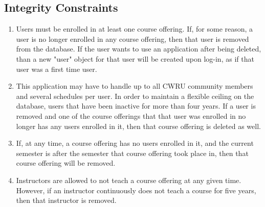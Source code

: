 \documentclass[pdftex,12pt,letter]{article}
\begin{document}
\subsection*{Integrity Constraints}
\begin{enumerate}
\item Users must be enrolled in at least one course offering. If, for some reason, a user is no longer enrolled in any course offering, then that user is removed from the database. If the user wants to use an application after being deleted, than a new "user" object for that user will be created upon log-in, as if that user was a first time user.
\item This application may have to handle up to all CWRU community members and several schedules per user. In order to maintain a flexible ceiling on the database, users that have been inactive for more than four years. If a user is removed and one of the course offerings that that user was enrolled in no longer has any users enrolled in it, then that course offering is deleted as well.
\item If, at any time, a course offering has no users enrolled in it, and the current semester is after the semester that course offering took place in, then that course offering will be removed.
\item Instructors are allowed to not teach a course offering at any given time. However, if an instructor continuously does not teach a course for five years, then that instructor is removed.
\end{enumerate}
\end{document}
